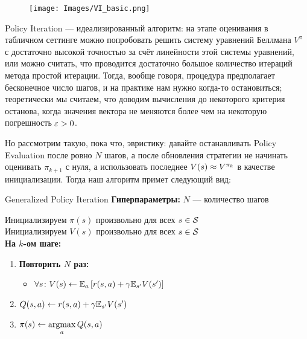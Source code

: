 \begin{wrapfigure}{r}{0.35\textwidth}
\vspace{-1.3cm}
\centering
\texttt{[image: Images/VI\_basic.png]}
\vspace{-0.7cm}
\end{wrapfigure}

Policy Iteration --- идеализированный алгоритм: на этапе оценивания в табличном сеттинге можно попробовать решить систему уравнений Беллмана $V^\pi$ с достаточно высокой точностью за счёт линейности этой системы уравнений, или можно считать, что проводится достаточно большое количество итераций метода простой итерации. Тогда, вообще говоря, процедура предполагает бесконечное число шагов, и на практике нам нужно когда-то остановиться; теоретически мы считаем, что доводим вычисления до некоторого критерия останова, когда значения вектора не меняются более чем на некоторую погрешность $\eps \HM> 0$. 

Но рассмотрим такую, пока что, эвристику: давайте останавливать Policy Evaluation после ровно $N$ шагов, а после обновления стратегии не начинать оценивать $\pi_{k+1}$ с нуля, а использовать последнее $V(s) \HM\approx V^{\pi_k}$ в качестве инициализации. Тогда наш алгоритм примет следующий вид: 

\begin{algorithm}[label=generalizedpolicyiteration]{Generalized Policy Iteration}
\textbf{Гиперпараметры:} $N$ --- количество шагов

\vspace{0.3cm}
Инициализируем $\pi(s)$ произвольно для всех $s \in \mathcal{S}$ \\
Инициализируем $V(s)$ произвольно для всех $s \in \mathcal{S}$ \\ 
\textbf{На $k$-ом шаге:}
\begin{enumerate}
    \item \textbf{Повторить $N$ раз:}
    \begin{itemize}
        \item $\forall s \colon V(s) \leftarrow \mathbb{E}_{a} \left[ r(s, a) + \gamma \mathbb{E}_{s'} V(s')\right]$
    \end{itemize}
    \item $Q(s, a) \leftarrow r(s, a) + \gamma \mathbb{E}_{s'} V(s')$
    \item $\pi(s) \leftarrow \mathop{\mathrm{argmax}}\limits_a Q(s, a)$
\end{enumerate}
\end{algorithm}

